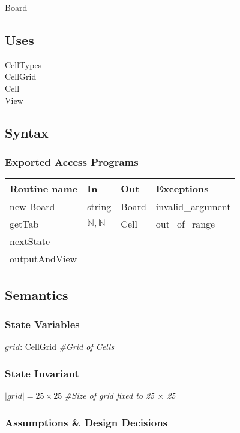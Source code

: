 \documentclass[12pt]{article}
\begin{document}
Board

\subsection* {Uses}

\noindent CellTypes\\
\noindent CellGrid\\
\noindent Cell\\
\noindent View

\subsection* {Syntax}

\subsubsection* {Exported Access Programs}

\begin{tabular}{| l | l | l | l |}
\hline
\textbf{Routine name} & \textbf{In} & \textbf{Out} & \textbf{Exceptions}\\
\hline
new Board  & string & Board & invalid\_argument\\
\hline
getTab & $\mathbb{N, N}$ & Cell & out\_of\_range\\
\hline
nextState & & & \\
\hline
outputAndView & & & \\
\hline
\end{tabular}

\subsection* {Semantics}

\subsubsection* {State Variables}

$grid$: CellGrid \textit{\#Grid of Cells}

\subsubsection* {State Invariant}

$|grid| = 25 \times 25$ \textit{\#Size of grid fixed to 25 $\times$ 25}

\subsubsection* {Assumptions \& Design Decisions}
\end{document}
